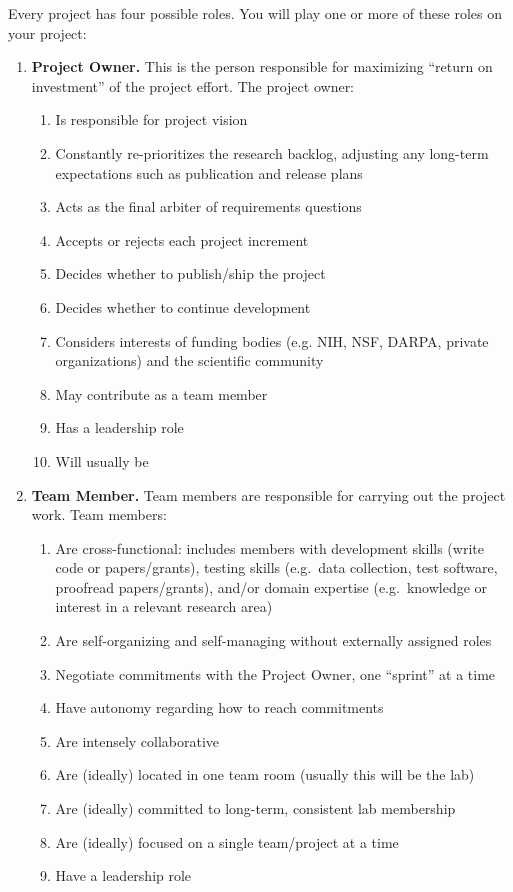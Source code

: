 \documentclass{tufte-book} %
\begin{document}
\noindent Every project has four possible roles. You will play one or more of these roles on your project:
\begin{enumerate}
\item \textbf{Project Owner.} This is the person responsible for maximizing ``return on investment'' of the project effort. The project owner:
\begin{enumerate}
\item Is responsible for project vision
\item Constantly re-prioritizes the research backlog, adjusting any long-term expectations such as publication and release plans
\item Acts as the final arbiter of requirements questions
\item Accepts or rejects each project increment
\item Decides whether to publish/ship the project
\item Decides whether to continue development
\item Considers interests of funding bodies (e.g. NIH, NSF, DARPA, private organizations) and the scientific community
\item May contribute as a team member
\item Has a leadership role
\item Will usually be \director
\end{enumerate}

\item \textbf{Team Member.} Team members are responsible for carrying out the project work. Team members:
\begin{enumerate}
\item Are cross-functional: includes members with development skills (write code or papers/grants), testing skills (e.g.\ data collection, test software, proofread papers/grants), and/or domain expertise (e.g.\ knowledge or interest in a relevant research area)
\item Are self-organizing and self-managing without externally assigned roles
\item Negotiate commitments with the Project Owner, one ``sprint'' at a time
\item Have autonomy regarding how to reach commitments
\item Are intensely collaborative
\item Are (ideally) located in one team room (usually this will be the lab)
\item Are (ideally) committed to long-term, consistent lab membership
\item Are (ideally) focused on a single team/project at a time
\item Have a leadership role
\end{enumerate}


\end{enumerate}
\end{document}

